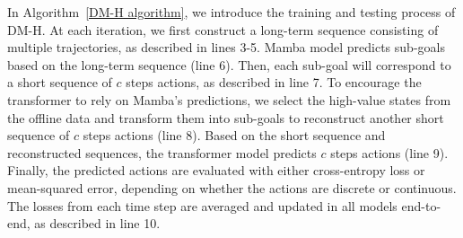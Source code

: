 \begin{algorithm}[h!]
{    
}
\end{algorithm}

In Algorithm~\ref{DM-H algorithm}, we introduce the training and testing process of DM-H. At each iteration, we first construct a long-term sequence consisting of multiple trajectories, as described in lines 3-5. Mamba model predicts sub-goals based on the long-term sequence (line 6). Then, each sub-goal will correspond to a short sequence of $c$ steps actions, as described in line 7. 
To encourage the transformer to rely on Mamba's predictions, we select the high-value states from the offline data and transform them into sub-goals to reconstruct another short sequence of $c$ steps actions (line 8). Based on the short sequence and reconstructed sequences, the transformer model predicts $c$ steps actions (line 9). Finally, the predicted actions are evaluated with either cross-entropy loss or mean-squared error, depending on whether the actions are discrete or continuous. The losses from each time step are averaged and updated in all models end-to-end, as described in line 10.


